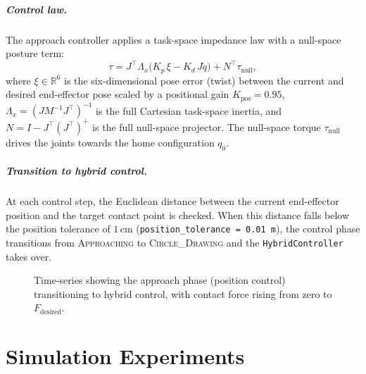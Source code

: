 \documentclass[
	german,%
	accentcolor=9c,%
	ruledheaders=section,%
	class=report,%
	thesis={type=bachelor},%
	fontsize=11pt,%
	parskip=half-,%
	custommargins=true,%
	marginpar=false,%
]{tudapub}
\begin{document}
\paragraph{Control law.}
The approach controller applies a task-space impedance law with a null-space
posture term:
\begin{equation}
    \tau = J^\top \Lambda_x
           \bigl(K_p\,\xi - K_d\,J\dot{q}\bigr)
           + N^\top \tau_\text{null},
    \label{eq:approach_law}
\end{equation}
where \(\xi \in \mathbb{R}^6\) is the six-dimensional pose error (twist)
between the current and desired end-effector pose scaled by a positional gain
\(K_\text{pos} = 0.95\), \(\Lambda_x = (J M^{-1} J^\top)^{-1}\) is the
full Cartesian task-space inertia, and \(N = I - J^\top (J^\top)^+\) is
the full null-space projector.
The null-space torque \(\tau_\text{null}\) drives the joints towards the
home configuration \(q_0\).

\paragraph{Transition to hybrid control.}
At each control step, the Euclidean distance between the current
end-effector position and the target contact point is checked.
When this distance falls below the position tolerance of
\(1\,\mathrm{cm}\) (\texttt{position\_tolerance = 0.01\,m}), the
control phase transitions from \textsc{Approaching} to
\textsc{Circle\_Drawing} and the \texttt{HybridController} takes over.

\begin{figure}[htbp]
    \centering
    \caption{Time-series showing the approach phase (position control)
             transitioning to hybrid control, with contact force rising from
             zero to $F_\text{desired}$.}
    \label{fig:approach_transition}
\end{figure}


\chapter{Simulation Experiments}
\label{chap:simulation_experiments}
\end{document}
